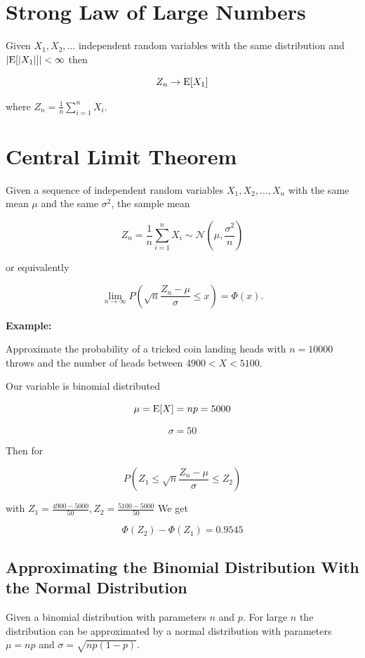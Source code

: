 \section{Strong Law of Large Numbers}

Given \(X_1, X_2, \dots\) independent random variables with the same distribution and \(|\mathrm{E}[|X_1|]| < \infty\) then

\[
    Z_n \to \mathrm{E}[X_1]
\]

where \(Z_n = \frac{1}{n} \sum_{i = 1}^{n}X_i\).

\section{Central Limit Theorem}

Given a sequence of independent random variables \(X_1, X_2, \dots, X_n\) with the same 
mean \(\mu\) and the same \(\sigma^2\), the sample mean 

\[
    Z_n = \frac{1}{n} \sum_{i = 1}^{n}X_i \sim \mathcal{N}\left(\mu, \frac{\sigma^2}{n}\right)
\]

or equivalently

\[
    \lim_{n \to \infty} P \left(\sqrt{n} \frac{Z_n - \mu}{\sigma} \le x\right) = \Phi (x).
\]

\textbf{Example:}

Approximate the probability of a tricked coin landing heads with \(n = 10000\) throws and the number of 
heads between \(4900 < X < 5100\).

Our variable is binomial distributed 

\[
    \mu = \mathrm{E}[X] = np = 5000
\]

\[
    \sigma = 50
\]

Then for  

\[
    P \left( Z_1 \le \sqrt{n} \frac{Z_n - \mu}{\sigma} \le Z_2 \right)
\]

with \(Z_1 = \frac{4900 - 5000}{50}, Z_2 = \frac{5100 - 5000}{50}\)
We get 

\[
    \Phi(Z_2) - \Phi(Z_1) = 0.9545
\]

\subsection{Approximating the Binomial Distribution With the Normal Distribution}

Given a binomial distribution with parameters \(n\) and \(p\). For large \(n\) the distribution can be approximated
by a normal distribution with parameters \(\mu = np\) and \(\sigma = \sqrt{np(1 - p)}\).

